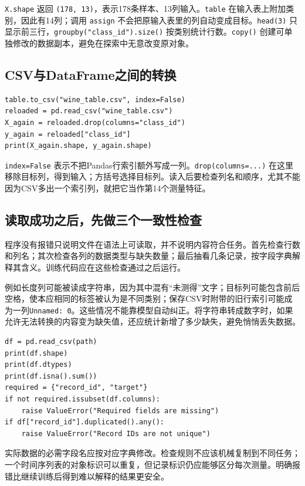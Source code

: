 \texttt{X.shape} 返回 \texttt{(178, 13)}，表示178条样本、13列输入。\texttt{table} 在输入表上附加类别，因此有14列；调用 \texttt{assign} 不会把原输入表里的列自动变成目标。\texttt{head(3)} 只显示前三行，\texttt{groupby("class\_id").size()} 按类别统计行数。\texttt{copy()} 创建可单独修改的数据副本，避免在探索中无意改变原对象。

\subsection{CSV与DataFrame之间的转换}
\begin{lstlisting}[caption={把同一数据保存为CSV后重新读入}]
table.to_csv("wine_table.csv", index=False)
reloaded = pd.read_csv("wine_table.csv")
X_again = reloaded.drop(columns="class_id")
y_again = reloaded["class_id"]
print(X_again.shape, y_again.shape)
\end{lstlisting}
\texttt{index=False} 表示不把Pandas行索引额外写成一列。\texttt{drop(columns=...)} 在这里移除目标列，得到输入；方括号选择目标列。读入后要检查列名和顺序，尤其不能因为CSV多出一个索引列，就把它当作第14个测量特征。

\subsection{读取成功之后，先做三个一致性检查}
程序没有报错只说明文件在语法上可读取，并不说明内容符合任务。首先检查行数和列名；其次检查各列的数据类型与缺失数量；最后抽看几条记录，按字段字典解释其含义。训练代码应在这些检查通过之后运行。

例如长度列可能被读成字符串，因为其中混有“未测得”文字；目标列可能包含前后空格，使本应相同的标签被认为是不同类别；保存CSV时附带的旧行索引可能成为一列\texttt{Unnamed: 0}。这些情况不能靠模型自动纠正。将字符串转成数字时，如果允许无法转换的内容变为缺失值，还应统计新增了多少缺失，避免悄悄丢失数据。

\begin{lstlisting}[caption={读取一个已说明字段含义的CSV后检查数据}]
df = pd.read_csv(path)
print(df.shape)
print(df.dtypes)
print(df.isna().sum())
required = {"record_id", "target"}
if not required.issubset(df.columns):
    raise ValueError("Required fields are missing")
if df["record_id"].duplicated().any():
    raise ValueError("Record IDs are not unique")
\end{lstlisting}
实际数据的必需字段名应按对应字典修改。检查规则不应该机械复制到不同任务；一个时间序列表的对象标识可以重复，但记录标识仍应能够区分每次测量。明确报错比继续训练后得到难以解释的结果更安全。

